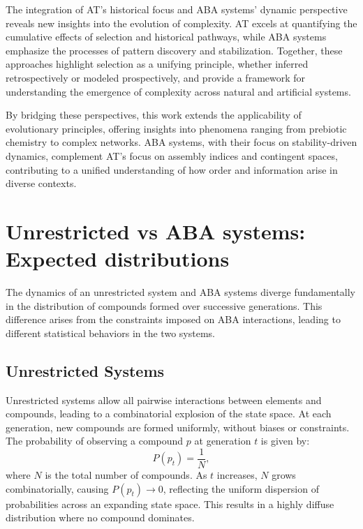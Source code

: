\documentclass[entropy,article,submit,pdftex,oneauthor]{Definitions/mdpi}
\begin{document}
The integration of AT’s historical focus and ABA systems’ dynamic perspective reveals new insights into the evolution of complexity. AT excels at quantifying the cumulative effects of selection and historical pathways, while ABA systems emphasize the processes of pattern discovery and stabilization. Together, these approaches highlight selection as a unifying principle, whether inferred retrospectively or modeled prospectively, and provide a framework for understanding the emergence of complexity across natural and artificial systems.

By bridging these perspectives, this work extends the applicability of evolutionary principles, offering insights into phenomena ranging from prebiotic chemistry to complex networks. ABA systems, with their focus on stability-driven dynamics, complement AT’s focus on assembly indices and contingent spaces, contributing to a unified understanding of how order and information arise in diverse contexts.



\section{Unrestricted vs ABA systems: Expected distributions}

The dynamics of an unrestricted system and ABA systems diverge fundamentally in the distribution of compounds formed over successive generations. This difference arises from the constraints imposed on ABA interactions, leading to different statistical behaviors in the two systems.

\subsection{Unrestricted Systems}

Unrestricted systems allow all pairwise interactions between elements and compounds, leading to a combinatorial explosion of the state space. At each generation, new compounds are formed uniformly, without biases or constraints. The probability of observing a compound \( p \) at generation \( t \) is given by:
\begin{equation}
P(p_t) = \frac{1}{N},
\end{equation}
where \( N \) is the total number of compounds. As \( t \) increases, \( N \) grows combinatorially, causing \( P(p_t) \to 0 \), reflecting the uniform dispersion of probabilities across an expanding state space. This results in a highly diffuse distribution where no compound dominates.
\end{document}
